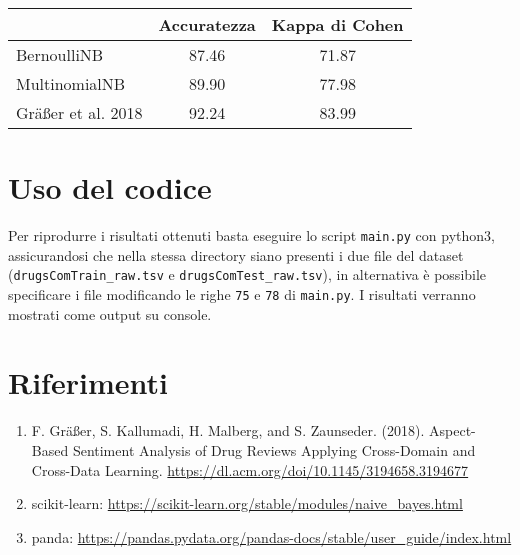 \documentclass{article}
\begin{document}
\begin{center}
	\begin{tabular}{ l c c }
		\hline
		                   & Accuratezza & Kappa di Cohen \\
		\hline
		BernoulliNB        & 87.46       & 71.87          \\
		\hline
		MultinomialNB      & 89.90       & 77.98          \\
		\hline
		\hline
		Gräßer et al. 2018 & 92.24       & 83.99          \\
		\hline
	\end{tabular}
\end{center}

\section{Uso del codice}
Per riprodurre i risultati ottenuti basta eseguire lo script \texttt{main.py} con python3,
assicurandosi che nella stessa directory siano presenti i due file del dataset
(\texttt{drugsComTrain\_raw.tsv} e \texttt{drugsComTest\_raw.tsv}), in alternativa è possibile
specificare i file modificando le righe \texttt{75} e \texttt{78} di \texttt{main.py}.
I risultati verranno mostrati come output su console.

\section{Riferimenti}
\begin{enumerate}
	\item F. Gräßer, S. Kallumadi, H. Malberg, and S. Zaunseder. (2018). Aspect-Based Sentiment Analysis of Drug Reviews Applying Cross-Domain and Cross-Data Learning.
	      \url{https://dl.acm.org/doi/10.1145/3194658.3194677}
	\item scikit-learn: \url{https://scikit-learn.org/stable/modules/naive_bayes.html}
	\item panda: \url{https://pandas.pydata.org/pandas-docs/stable/user_guide/index.html}
\end{enumerate}
\end{document}

